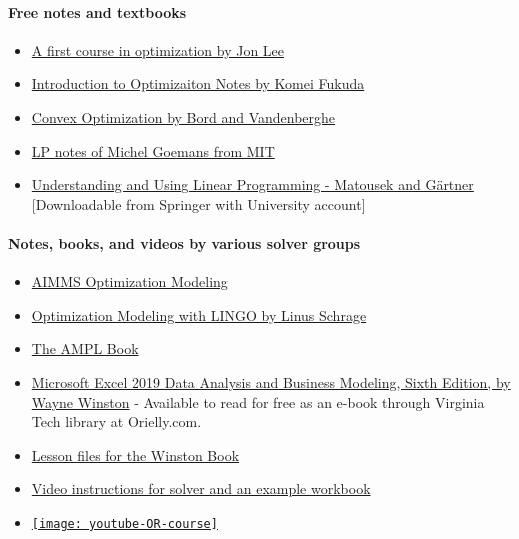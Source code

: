 \documentclass[letter,12pt]{book}
\renewcommand{\0}{\mathbf{0}}
\begin{document}
\paragraph{\textbf{Free notes and textbooks}}
\begin{itemize}
\item \href{http://www.optimization-online.org/DB_FILE/2013/12/4161.pdf}{A first course in optimization by Jon Lee}
\item \href{https://people.inf.ethz.ch/fukudak/lect/opt2011/aopt11note1.pdf}{Introduction to Optimizaiton Notes by Komei Fukuda}
\item \href{https://web.stanford.edu/~boyd/cvxbook/}{Convex Optimization by Bord and Vandenberghe}
\item  \href{http://math.mit.edu/~goemans/18310S15/lpnotes310.pdf}{LP notes of Michel Goemans from MIT }
\item \href{https://www.springer.com/gp/book/9783540306979}{Understanding and Using Linear Programming - Matousek and G\"artner} [Downloadable from Springer with University account]
\end{itemize}
\paragraph{\textbf{Notes, books, and videos by various solver groups}}
\begin{itemize}
\item \href{https://www.aimms.com/english/developers/resources/manuals/optimization-modeling/}{AIMMS Optimization Modeling}
\item \href{https://www.lindo.com/index.php/ls-downloads?id=112:lingo-documentation&catid=82}{Optimization Modeling with LINGO by Linus Schrage} 
\item \href{https://ampl.com/resources/the-ampl-book/chapter-downloads/}{The AMPL Book}
\item \href{https://learning.oreilly.com/library/view/microsoft-excel-2019/9781509306091/?ar}{Microsoft Excel 2019 Data Analysis and Business Modeling, Sixth Edition, by Wayne Winston} - Available to read for free as an e-book through Virginia Tech library at Orielly.com.
\item \href{https://www.microsoftpressstore.com/store/microsoft-excel-2019-data-analysis-and-business-modeling-9781509305889}{Lesson files for the Winston Book}
\item \href{https://www.xelplus.com/excel-solver-example/}{Video instructions for solver and an example workbook}

\item \href{https://www.youtube.com/playlist?list=PLgA4wLGrqI-ll9OSJmR5nU4lV4_aNTgKx}
{\texttt{[image: youtube-OR-course]}}
\end{itemize}
\end{document}

